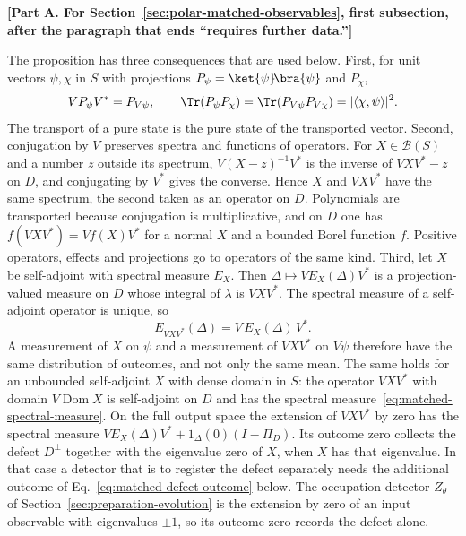 \par\medskip\noindent\textbf{[Part A. For Section~\ref{sec:polar-matched-observables}, first subsection, after the paragraph that ends ``requires further data.'']}\par\smallskip

The proposition has three consequences that are used below. First, for unit vectors $\psi,\chi$ in $S$ with projections $P_\psi=\ket{\psi}\!\bra{\psi}$ and $P_\chi$,
\begin{equation}
 VP_\psi V^*=P_{V\psi},\qquad
 \Tr(P_\psi P_\chi)=\Tr(P_{V\psi}P_{V\chi})=|\langle\chi,\psi\rangle|^2 .
 \label{eq:matched-pure-projections}
\end{equation}
The transport of a pure state is the pure state of the transported vector. Second, conjugation by $V$ preserves spectra and functions of operators. For $X\in\mathcal B(S)$ and a number $z$ outside its spectrum, $V(X-z)^{-1}V^*$ is the inverse of $VXV^*-z$ on $D$, and conjugating by $V^*$ gives the converse. Hence $X$ and $VXV^*$ have the same spectrum, the second taken as an operator on $D$. Polynomials are transported because conjugation is multiplicative, and on $D$ one has $f(VXV^*)=Vf(X)V^*$ for a normal $X$ and a bounded Borel function $f$. Positive operators, effects and projections go to operators of the same kind. Third, let $X$ be self-adjoint with spectral measure $E_X$. Then $\Delta\mapsto VE_X(\Delta)V^*$ is a projection-valued measure on $D$ whose integral of $\lambda$ is $VXV^*$. The spectral measure of a self-adjoint operator is unique, so
\begin{equation}
 E_{VXV^*}(\Delta)=V\,E_X(\Delta)\,V^* .
 \label{eq:matched-spectral-measure}
\end{equation}
A measurement of $X$ on $\psi$ and a measurement of $VXV^*$ on $V\psi$ therefore have the same distribution of outcomes, and not only the same mean. The same holds for an unbounded self-adjoint $X$ with dense domain in $S$: the operator $VXV^*$ with domain $V\operatorname{Dom}X$ is self-adjoint on $D$ and has the spectral measure~\eqref{eq:matched-spectral-measure}. On the full output space the extension of $VXV^*$ by zero has the spectral measure $VE_X(\Delta)V^*+1_\Delta(0)(I-\Pi_D)$. Its outcome zero collects the defect $D^\perp$ together with the eigenvalue zero of $X$, when $X$ has that eigenvalue. In that case a detector that is to register the defect separately needs the additional outcome of Eq.~\eqref{eq:matched-defect-outcome} below. The occupation detector $Z_\theta$ of Section~\ref{sec:preparation-evolution} is the extension by zero of an input observable with eigenvalues $\pm1$, so its outcome zero records the defect alone.


